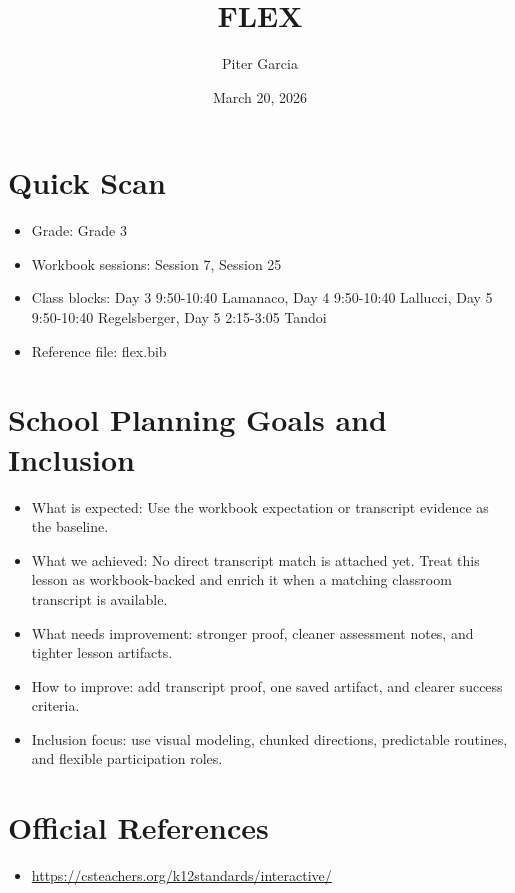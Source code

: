 \documentclass[11pt]{article}
\title{FLEX}
\author{Piter Garcia}
\date{March 20, 2026}
\begin{document}
\maketitle
\section*{Quick Scan}
\begin{itemize}[leftmargin=*]
\item Grade: Grade 3
\item Workbook sessions: Session 7, Session 25
\item Class blocks: Day 3 9:50-10:40 Lamanaco, Day 4 9:50-10:40 Lallucci, Day 5 9:50-10:40 Regelsberger, Day 5 2:15-3:05 Tandoi
\item Reference file: flex.bib
\end{itemize}
\section*{School Planning Goals and Inclusion}
\begin{itemize}[leftmargin=*]
\item What is expected: Use the workbook expectation or transcript evidence as the baseline.
\item What we achieved: No direct transcript match is attached yet. Treat this lesson as workbook-backed and enrich it when a matching classroom transcript is available.
\item What needs improvement: stronger proof, cleaner assessment notes, and tighter lesson artifacts.
\item How to improve: add transcript proof, one saved artifact, and clearer success criteria.
\item Inclusion focus: use visual modeling, chunked directions, predictable routines, and flexible participation roles.
\end{itemize}
\section*{Official References}
\begin{itemize}[leftmargin=*]
\item \url{https://csteachers.org/k12standards/interactive/}

\end{itemize}
\end{document}
